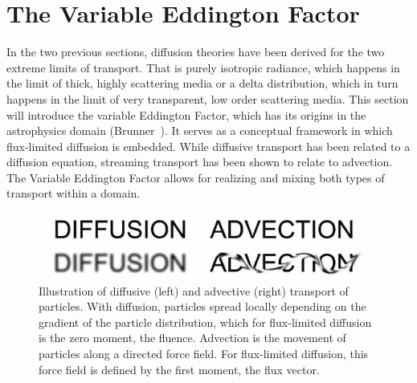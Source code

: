 \section{The Variable Eddington Factor}
\label{sec:fld_vef}

In the two previous sections, diffusion theories have been derived for the two extreme limits of transport. That is purely isotropic radiance, which happens in the limit of thick, highly scattering media or a delta distribution, which in turn happens in the limit of very transparent, low order scattering media. This section will introduce the variable Eddington Factor, which has its origins in the astrophysics domain (Brunner~\cite{Brunner02}). It serves as a conceptual framework in which flux-limited diffusion is embedded. While diffusive transport has been related to a diffusion equation, streaming transport has been shown to relate to advection. The Variable Eddington Factor allows for realizing and mixing both types of transport within a domain.
\begin{figure}[h]
\centering
\includegraphics[width=0.95\textwidth]{06_fld/figures/fig_diffusion_vs_advection.pdf}
\caption{Illustration of diffusive (left) and advective (right) transport of particles. With diffusion, particles spread locally depending on the gradient of the particle distribution, which for flux-limited diffusion is the zero moment, the fluence. Advection is the movement of particles along a directed force field. For flux-limited diffusion, this force field is defined by the first moment, the flux vector.}
\label{fig:fld_vef_advection_diffusion}
\end{figure}


